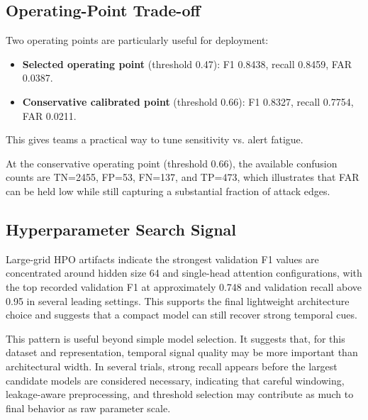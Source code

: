 \documentclass[conference]{IEEEtran}
\begin{document}
\begin{table}[htbp]
\caption{Model Comparison (from \texttt{evaluation/model\_comparison.csv})}
\label{tab:modelcomp}
\centering
\setlength{\tabcolsep}{3pt}
\footnotesize
{}
\end{table}

\subsection{Operating-Point Trade-off}
Two operating points are particularly useful for deployment:
\begin{itemize}
\item \textbf{Selected operating point} (threshold 0.47): F1 0.8438, recall 0.8459, FAR 0.0387.
\item \textbf{Conservative calibrated point} (threshold 0.66): F1 0.8327, recall 0.7754, FAR 0.0211.
\end{itemize}
This gives teams a practical way to tune sensitivity vs. alert fatigue.

At the conservative operating point (threshold 0.66), the available confusion counts are TN=2455, FP=53, FN=137, and TP=473, which illustrates that FAR can be held low while still capturing a substantial fraction of attack edges.

\subsection{Hyperparameter Search Signal}
Large-grid HPO artifacts indicate the strongest validation F1 values are concentrated around hidden size 64 and single-head attention configurations, with the top recorded validation F1 at approximately 0.748 and validation recall above 0.95 in several leading settings. This supports the final lightweight architecture choice and suggests that a compact model can still recover strong temporal cues.

This pattern is useful beyond simple model selection. It suggests that, for this dataset and representation, temporal signal quality may be more important than architectural width. In several trials, strong recall appears before the largest candidate models are considered necessary, indicating that careful windowing, leakage-aware preprocessing, and threshold selection may contribute as much to final behavior as raw parameter scale.
\end{document}
